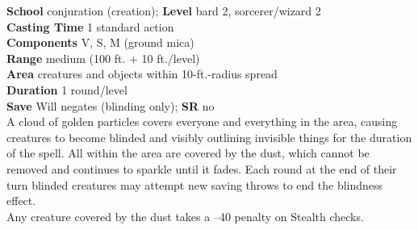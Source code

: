 \textbf{School }conjuration (creation); \textbf{Level }bard 2, sorcerer/wizard 2\\
\textbf{Casting Time }1 standard action\\
\textbf{Components }V, S, M (ground mica)\\
\textbf{Range }medium (100 ft. + 10 ft./level)\\
\textbf{Area }creatures and objects within 10-ft.-radius spread\\
\textbf{Duration }1 round/level\\
\textbf{Save }Will negates (blinding only); \textbf{SR }no\\
A cloud of golden particles covers everyone and everything in the area, causing creatures to become blinded and visibly outlining invisible things for the duration of the spell. All within the area are covered by the dust, which cannot be removed and continues to sparkle until it fades. Each round at the end of their turn blinded creatures may attempt new saving throws to end the blindness effect.\\
Any creature covered by the dust takes a --40 penalty on Stealth checks.\\
